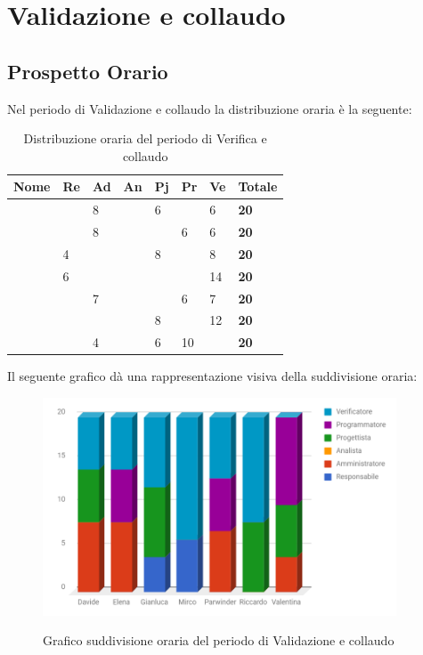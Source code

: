 \documentclass[PianoDiProgetto.tex]{subfiles}
\begin{document}
\section{Validazione e collaudo}
\subsection{Prospetto Orario}
Nel periodo di Validazione e collaudo la distribuzione oraria è la seguente:
\begin{center}
	\begin{table}[htbp]
		\centering
		\renewcommand\arraystretch{1.5}
		\begin{tabularx}{\textwidth}{p{4cm}|p{1cm}|p{1cm}|p{1cm}|p{1cm}|p{1cm}|p{1cm}|p{2cm}}
			\hline
			\textbf{Nome} & \textbf{Re} & \textbf{Ad} & \textbf{An} & \textbf{Pj} & \textbf{Pr} & \textbf{Ve} & \textbf{Totale} \\
			\hline
			\Davide & \ & 8 & \ & 6 & \ & 6 & \textbf{20} \\
			\hline
			\Elena & \ & 8 & \ & \ & 6 & 6 & \textbf{20} \\
			\hline
			\Gianluca & 4 & \ & \ & 8 & \ & 8 & \textbf{20} \\
			\hline
			\Mirco & 6 & \ & \ & \ & \ & 14 & \textbf{20} \\
			\hline
			\Parwinder & \ & 7 & \ & \ & 6 & 7 & \textbf{20} \\
			\hline
			\Riccardo & \ & \ & \ & 8 & \ & 12 & \textbf{20} \\
			\hline
			\Valentina & \ & 4 & \ & 6 & 10 & \ & \textbf{20} \\
			\hline
		\end{tabularx}
	\caption{Distribuzione oraria del periodo di Verifica e collaudo}
	\label{my-label}
	\end{table} 	
\end{center}
Il seguente grafico dà una rappresentazione visiva della suddivisione oraria:
\begin{figure}[h]
	\centering
	\includegraphics[width=10.5cm]{images/prospettoOrario/valCol.png}
	\label{fig:foo}
	\caption{Grafico suddivisione oraria del periodo di Validazione e collaudo}
\end{figure} 
\newpage
\end{document}
